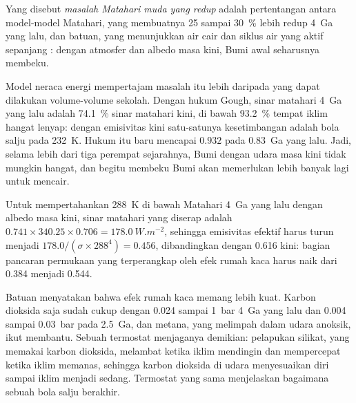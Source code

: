 \begin{definition}\label{def:b2:precambrian-earth:faint-sun}
Yang disebut \emph{masalah Matahari muda yang redup} adalah pertentangan antara
model-model Matahari, yang membuatnya 25 sampai \qty{30}{\percent} lebih redup \qty{4}{Ga} yang lalu, dan
batuan, yang menunjukkan air cair dan siklus air yang aktif sepanjang : dengan atmosfer
dan albedo masa kini, Bumi awal seharusnya membeku.
\end{definition}

Model neraca energi mempertajam masalah itu lebih daripada yang dapat dilakukan volume-volume sekolah. Dengan hukum
Gough, sinar matahari \qty{4}{Ga} yang lalu adalah \qty{74.1}{\percent} sinar matahari kini, di bawah
\qty{93.2}{\percent} tempat iklim hangat lenyap: dengan emisivitas kini satu-satunya
kesetimbangan adalah bola salju pada \qty{232}{K}. Hukum itu baru mencapai $0.932$ pada
\qty{0.83}{Ga} yang lalu. Jadi, selama lebih dari tiga perempat sejarahnya, Bumi dengan
udara masa kini tidak mungkin hangat, dan begitu membeku Bumi akan memerlukan lebih banyak lagi untuk mencair.

\begin{example}\label{ex:b2:precambrian-earth:young-greenhouse}
Untuk mempertahankan \qty{288}{K} di bawah Matahari \qty{4}{Ga} yang lalu dengan albedo masa kini, sinar matahari
yang diserap adalah $0.741\times340.25\times0.706 = \qty{178.0}{W.m^{-2}}$, sehingga emisivitas efektif
harus turun menjadi $178.0/(\sigma\times288^4) = 0.456$, dibandingkan dengan 0.616 kini: bagian
pancaran permukaan yang terperangkap oleh efek rumah kaca harus naik dari 0.384 menjadi 0.544.
\end{example}

Batuan menyatakan bahwa efek rumah kaca memang lebih kuat. Karbon dioksida saja sudah cukup dengan
0.024 sampai \qty{1}{bar} \qty{4}{Ga} yang lalu dan 0.004 sampai \qty{0.03}{bar} pada \qty{2.5}{Ga}, dan
metana, yang melimpah dalam udara anoksik, ikut membantu. Sebuah termostat menjaganya demikian: pelapukan silikat,
yang memakai karbon dioksida, melambat ketika iklim mendingin dan mempercepat ketika iklim memanas, sehingga
karbon dioksida di udara menyesuaikan diri sampai iklim menjadi sedang. Termostat yang sama menjelaskan
bagaimana sebuah bola salju berakhir.

